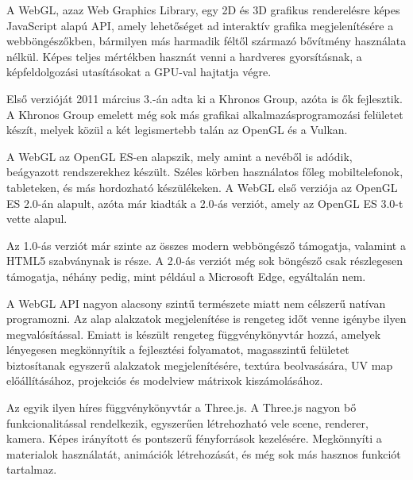 
A WebGL, azaz Web Graphics Library, egy 2D és 3D grafikus renderelésre képes JavaScript alapú API, amely lehetőséget ad interaktív grafika megjelenítésére a webböngészőkben, bármilyen más harmadik féltől származó bővítmény használata nélkül. Képes teljes mértékben hasznát venni a hardveres gyorsításnak, a képfeldolgozási utasításokat a GPU-val hajtatja végre. 

Első verzióját 2011 március 3.-án adta ki a Khronos Group, azóta is ők fejlesztik. A Khronos Group emelett még sok más grafikai alkalmazásprogramozási felületet készít, melyek közül a két legismertebb talán az OpenGL és a Vulkan.

A WebGL az OpenGL ES-en alapszik, mely amint a nevéből is adódik, beágyazott rendszerekhez készült. Széles körben használatos főleg mobiltelefonok, tableteken, és más hordozható készülékeken. A WebGL első verziója az OpenGL ES 2.0-án alapult, azóta már kiadták a 2.0-ás verziót, amely az OpenGL ES 3.0-t vette alapul.

Az 1.0-ás verziót már szinte az összes modern webböngésző támogatja, valamint a HTML5 szabványnak is része. A 2.0-ás verziót még sok böngésző csak részlegesen támogatja, néhány pedig, mint például a Microsoft Edge, egyáltalán nem.

A WebGL API nagyon alacsony szintű természete miatt nem célszerű natívan programozni. Az alap alakzatok megjelenítése is rengeteg időt venne igénybe ilyen megvalósítással. Emiatt is készült rengeteg függvénykönyvtár hozzá, amelyek lényegesen megkönnyítik a fejlesztési folyamatot, magasszintű felületet biztosítanak egyszerű alakzatok megjelenítésére, textúra beolvasására, UV map előállításához, projekciós és modelview mátrixok kiszámolásához.

Az egyik ilyen híres függvénykönyvtár a Three.js. A Three.js nagyon bő funkcionalitással rendelkezik, egyszerűen létrehozható vele scene, renderer, kamera. Képes irányított és pontszerű fényforrások kezelésére. Megkönnyíti a materialok használatát, animációk létrehozását, és még sok más hasznos funkciót tartalmaz.

